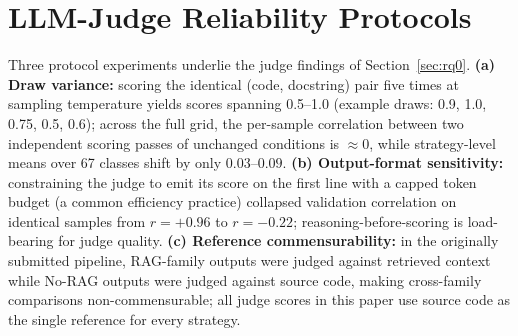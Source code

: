 \documentclass[pdflatex,sn-mathphys-ay]{sn-jnl}%
\theoremstyle{thmstyleone}%
\theoremstyle{thmstyletwo}%
\theoremstyle{thmstylethree}%
\begin{document}
{%
\section{LLM-Judge Reliability Protocols}
\label{app:judge-reliability}
Three protocol experiments underlie the judge findings of Section~\ref{sec:rq0}.
\textbf{(a) Draw variance:} scoring the identical (code, docstring) pair five times at sampling temperature yields scores spanning 0.5--1.0 (example draws: 0.9, 1.0, 0.75, 0.5, 0.6); across the full grid, the per-sample correlation between two independent scoring passes of unchanged conditions is ${\approx}0$, while strategy-level means over 67 classes shift by only $0.03$--$0.09$.
\textbf{(b) Output-format sensitivity:} constraining the judge to emit its score on the first line with a capped token budget (a common efficiency practice) collapsed validation correlation on identical samples from $r=+0.96$ to $r=-0.22$; reasoning-before-scoring is load-bearing for judge quality.
\textbf{(c) Reference commensurability:} in the originally submitted pipeline, RAG-family outputs were judged against retrieved context while No-RAG outputs were judged against source code, making cross-family comparisons non-commensurable; all judge scores in this paper use source code as the single reference for every strategy.


}
\end{document}
